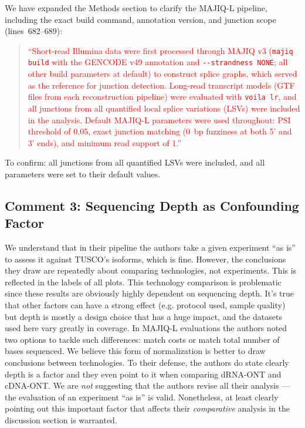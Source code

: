 \documentclass[11pt]{article}
\begin{document}
\begin{responseboxnew}
We have expanded the Methods section to clarify the MAJIQ-L pipeline, including the exact build command, annotation version, and junction scope (lines~682--689):

\begin{quote}
\textcolor{red}{``Short-read Illumina data were first processed through MAJIQ v3 (\texttt{majiq build} with the GENCODE v49 annotation and \texttt{-{}-strandness NONE}; all other build parameters at default) to construct splice graphs, which served as the reference for junction detection. Long-read transcript models (GTF files from each reconstruction pipeline) were evaluated with \texttt{voila lr}, and all junctions from all quantified local splice variations (LSVs) were included in the analysis. Default MAJIQ-L parameters were used throughout: PSI threshold of 0.05, exact junction matching (0~bp fuzziness at both 5' and 3' ends), and minimum read support of 1.''}
\end{quote}

To confirm: all junctions from all quantified LSVs were included, and all parameters were set to their default values.
\end{responseboxnew}

\subsection{Comment 3: Sequencing Depth as Confounding Factor}

\begin{reviewercomment}
We understand that in their pipeline the authors take a given experiment ``as is'' to assess it against TUSCO's isoforms, which is fine. However, the conclusions they draw are repeatedly about comparing technologies, not experiments. This is reflected in the labels of all plots. This technology comparison is problematic since these results are obviously highly dependent on sequencing depth. It's true that other factors can have a strong effect (e.g. protocol used, sample quality) but depth is mostly a design choice that has a huge impact, and the datasets used here vary greatly in coverage. In MAJIQ-L evaluations the authors noted two options to tackle such differences: match costs or match total number of bases sequenced. We believe this form of normalization is better to draw conclusions between technologies. To their defense, the authors do state clearly depth is a factor and they even point to it when comparing dRNA-ONT and cDNA-ONT. We are \emph{not} suggesting that the authors revise all their analysis --- the evaluation of an experiment ``as is'' is valid. Nonetheless, at least clearly pointing out this important factor that affects their \emph{comparative} analysis in the discussion section is warranted.
\end{reviewercomment}
\end{document}

